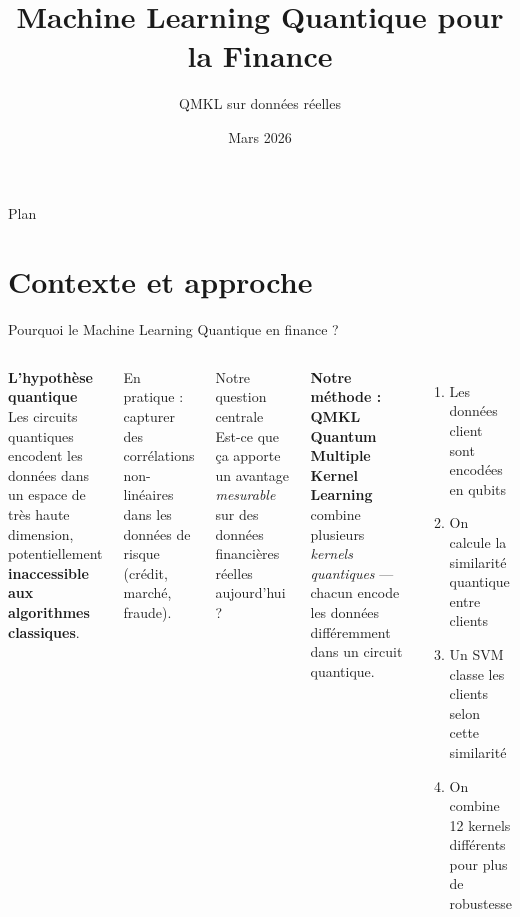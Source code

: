 \documentclass[aspectratio=169]{beamer}
\title{Machine Learning Quantique pour la Finance}
\subtitle{QMKL sur données réelles}
\author{}
\date{Mars 2026}
\begin{document}
\begin{frame}
  \titlepage
\end{frame}

\begin{frame}{Plan}
  \tableofcontents
\end{frame}

\section{Contexte et approche}

\begin{frame}{Pourquoi le Machine Learning Quantique en finance ?}
  \begin{columns}[T]
      \textbf{L'hypothèse quantique}\\[6pt]
      Les circuits quantiques encodent les données
      dans un espace de très haute dimension,
      potentiellement \textbf{inaccessible aux algorithmes classiques}.

      \bigskip
      En pratique : capturer des corrélations non-linéaires
      dans les données de risque (crédit, marché, fraude).

      \bigskip
      \begin{block}{Notre question centrale}
        Est-ce que ça apporte un avantage \emph{mesurable}
        sur des données financières réelles aujourd'hui ?
      \end{block}

      \textbf{Notre méthode : QMKL}\\[6pt]
      \textbf{Quantum Multiple Kernel Learning} combine
      plusieurs \emph{kernels quantiques} — chacun encode
      les données différemment dans un circuit quantique.

      \bigskip
      \begin{enumerate}
        \item Les données client sont encodées en qubits
        \item On calcule la similarité quantique entre clients
        \item Un SVM classe les clients selon cette similarité
        \item On combine 12 kernels différents pour plus de robustesse
      \end{enumerate}
  \end{columns}
\end{frame}
\end{document}
